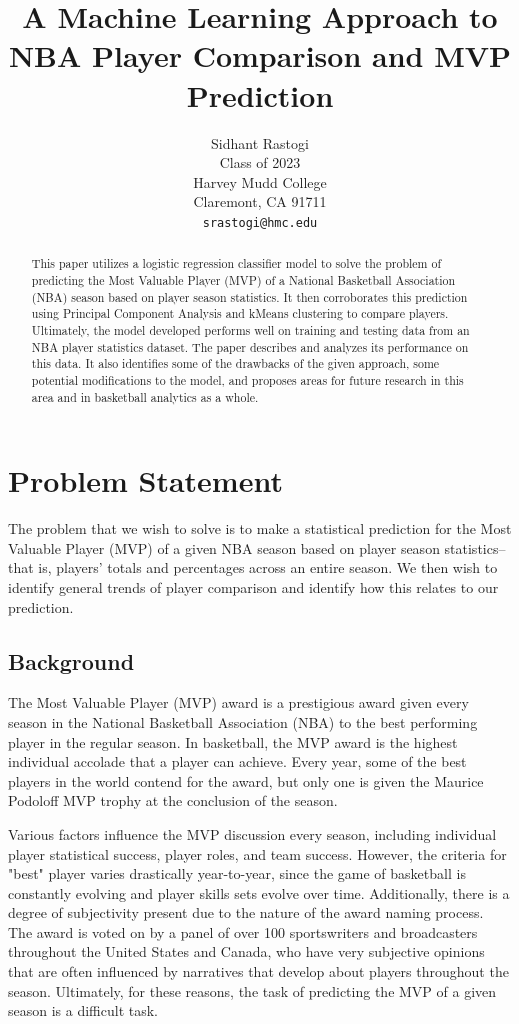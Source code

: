 \documentclass{article}
\title{A Machine Learning Approach to NBA Player Comparison and MVP Prediction}
\author{%
  \large Sidhant Rastogi\\
  \large Class of 2023\\
  \large Harvey Mudd College\\
  \large Claremont, CA 91711 \\
  \large \texttt{srastogi@hmc.edu} \\
}
\begin{document}

\maketitle

\begin{abstract}
\large This paper utilizes a logistic regression classifier model to solve the problem of predicting the Most Valuable Player (MVP) of a National Basketball Association (NBA) season based on player season statistics. It then corroborates this prediction using Principal Component Analysis and kMeans clustering to compare players. Ultimately, the model developed performs well on training and testing data from an NBA player statistics dataset. The paper describes and analyzes its performance on this data. It also identifies some of the drawbacks of the given approach, some potential modifications to the model, and proposes areas for future research in this area and in basketball analytics as a whole.
\end{abstract}

\section{Problem Statement}

\large The problem that we wish to solve is to make a statistical prediction for the Most Valuable Player (MVP) of a given NBA season based on player season statistics–that is, players' totals and percentages across an entire season. We then wish to identify general trends of player comparison and identify how this relates to our prediction.

\subsection{Background}

The Most Valuable Player (MVP) award is a prestigious award given every season in the National Basketball Association (NBA) to the best performing player in the regular season. In basketball, the MVP award is the highest individual accolade that a player can achieve. Every year, some of the best players in the world contend for the award, but only one is given the Maurice Podoloff MVP trophy at the conclusion of the season.

Various factors influence the MVP discussion every season, including individual player statistical success, player roles, and team success. However, the criteria for "best" player varies drastically year-to-year, since the game of basketball is constantly evolving and player skills sets evolve over time. Additionally, there is a degree of subjectivity present due to the nature of the award naming process. The award is voted on by a panel of over 100 sportswriters and broadcasters throughout the United States and Canada, who have very subjective opinions that are often influenced by narratives that develop about players throughout the season. Ultimately, for these reasons, the task of predicting the MVP of a given season is a difficult task.
\end{document}
